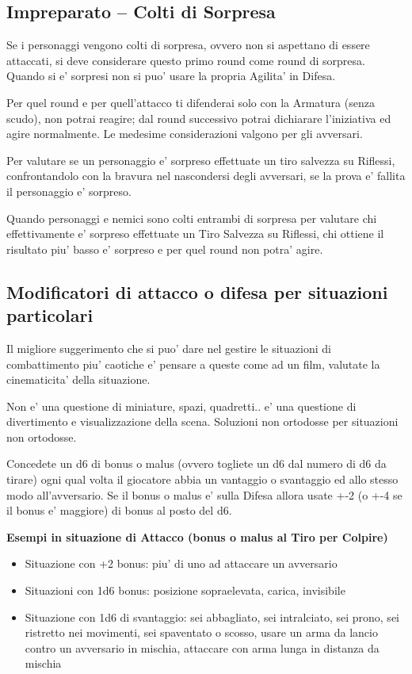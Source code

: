 \documentclass[a4paper,11pt,twoside,openany]{book}
\begin{document}
	\subsection{Impreparato -- Colti di Sorpresa}
	
	Se i personaggi vengono colti di sorpresa, ovvero non si aspettano di essere attaccati, si deve considerare questo primo round come round di sorpresa. Quando si e' sorpresi non si puo' usare la propria Agilita' in Difesa.
	
	Per quel round e per quell'attacco ti difenderai solo con la Armatura (senza scudo), non potrai reagire; dal round successivo potrai dichiarare l'iniziativa ed agire normalmente. Le medesime considerazioni valgono per gli avversari.
	
	Per valutare se un personaggio e' sorpreso effettuate un tiro salvezza su Riflessi, confrontandolo con la bravura nel nascondersi degli avversari, se la prova e' fallita il personaggio e' sorpreso. 
	
	Quando personaggi e nemici sono colti entrambi di sorpresa per valutare chi effettivamente e' sorpreso effettuate un Tiro Salvezza su Riflessi, chi ottiene il risultato piu' basso e' sorpreso e per quel round non potra' agire.
	
	\subsection{Modificatori di attacco o difesa per situazioni particolari} 
	
	Il migliore suggerimento che si puo' dare nel gestire le situazioni di combattimento piu' caotiche e' pensare a queste come ad un film, valutate la cinematicita' della situazione.
	
	Non e' una questione di miniature, spazi, quadretti.. e' una questione di divertimento e visualizzazione della scena. Soluzioni non ortodosse per situazioni non ortodosse.
	
	Concedete un d6 di bonus o malus (ovvero togliete un d6 dal numero di d6 da tirare) ogni qual volta il giocatore abbia un vantaggio o svantaggio ed allo stesso modo all'avversario. Se il bonus o malus e' sulla Difesa allora usate +-2 (o +-4 se il bonus e' maggiore) di bonus al posto del d6.
	
	\bigskip
	
	\textbf{Esempi in situazione di Attacco (bonus o malus al Tiro per Colpire)}
	
	\begin{itemize}
		\item Situazione con +2 bonus: piu' di uno ad attaccare un avversario
		
		\item Situazioni con 1d6 bonus: posizione sopraelevata, carica, invisibile
		
		\item Situazione con 1d6 di svantaggio: sei abbagliato, sei intralciato, sei prono, sei ristretto nei movimenti, sei spaventato o scosso, usare un arma da lancio contro un avversario in mischia, attaccare con arma lunga in distanza da mischia
	\end{itemize}
	
\end{document}
